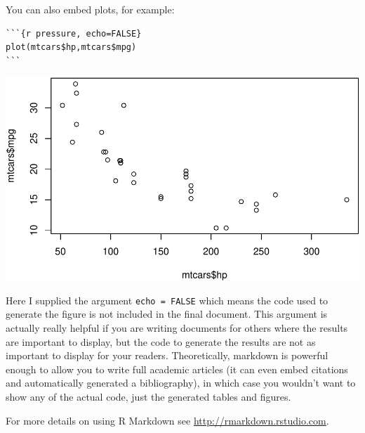 \documentclass[12pt, oneside]{amsart}   	%
\begin{document}
You can also embed plots, for example:

\begin{verbatim}
```{r pressure, echo=FALSE}
plot(mtcars$hp,mtcars$mpg)
```
\end{verbatim}

\includegraphics{week11rm_files/figure-latex/pressure-1.pdf}


Here I supplied the argument \texttt{echo = FALSE} which means the code used to generate the figure is not included in the final document. This argument is actually really helpful if you are writing documents for others where the results are important to display, but the code to generate the results are not as important to display for your readers. Theoretically, markdown is powerful enough to allow you to write full academic articles (it can even embed citations and automatically generated a bibliography), in which case you wouldn't want to show any of the actual code, just the generated tables and figures.

For more details on using R Markdown see
\url{http://rmarkdown.rstudio.com}.
\end{document}

